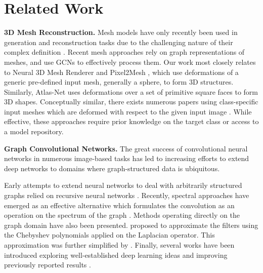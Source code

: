 \documentclass{article}
\begin{document}
\section{Related Work}


\textbf{3D Mesh Reconstruction.} \enskip
Mesh models have only recently been used in generation and reconstruction tasks due to the challenging nature of their complex definition \cite{Pixel2Mesh}. Recent mesh approaches rely on graph representations of meshes, and use GCNs \cite{GCN} to effectively process them. Our work most closely relates to Neural 3D Mesh Renderer \cite{kato2017neural} and Pixel2Mesh \cite{Pixel2Mesh}, which use deformations of a generic pre-defined input mesh, generally a sphere, to form 3D structures. Similarly, Atlas-Net \cite{groueix2018atlasnet} uses deformations over a set of primitive square faces to form 3D shapes. Conceptually similar, there exists numerous papers using class-specific input meshes which are deformed with respect to the given input image \cite{pontes2017image2mesh,kanazawa2018learning, jack2018learning,henderson2018learning,groueix20183d, Kar2015CategoryspecificOR}. While effective, these approaches require prior knowledge on the target class or access to a model repository. 

\textbf{Graph Convolutional Networks.} \enskip
The great success of convolutional neural networks in numerous image-based tasks \cite{He_identity_mappings,He2017maskrcnn,Huang2016,jegou2017one,Casanova18} has led to increasing efforts to extend deep networks to domains where graph-structured data is ubiquitous.

Early attempts to extend neural networks to deal with arbitrarily
structured graphs relied on recursive neural networks \cite{Frasconi98,Gori05,ScarselliGNN}. Recently, spectral approaches have emerged as an effective alternative which formulates the convolution as an operation on the spectrum of the graph \cite{Henaff2015DeepCN,bruna2014spectral,Bronstein2017GeometricDL,levie2017cayleynets}. Methods operating directly on the graph domain have also been presented. \citet{Defferrard:2016:CNN:3157382.3157527} proposed to approximate the filters using the Chebyshev polynomials applied on the Laplacian operator. This approximation was further simplified by \citet{GCN}. Finally, several works have been introduced exploring well-established deep learning ideas and improving previously reported results \cite{FingerPrint,GraphSAGE,Monti2017GeometricDL,GAT}.
\end{document}
